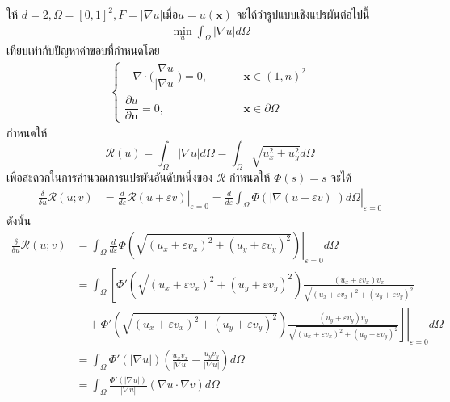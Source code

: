 \begin{Example}
    ให้ $d = 2, \Omega = [0,1]^2, F = |\nabla u| \text{เมื่อ} u = u(\mathbf{x})$ จะได้ว่ารูปแบบเชิงแปรผันต่อไปนี้ 
    \begin{align*}
        \underset{u}{\min} \int_{\Omega} |\nabla u| d \Omega 
    \end{align*}
    เทียบเท่ากับปัญหาค่าขอบที่กำหนดโดย
    \begin{align}
        \left \{ \begin{array}{ll}  - \nabla \cdot  \Big( \dfrac{\nabla u}{|\nabla u|} \Big) = 0,  & \hspace{1cm} \mathbf{x} \in (1,n)^2 \\ \dfrac{\partial u}{\partial \boldsymbol{n}} = 0, & \hspace{1cm} \mathbf{x} \in \partial \Omega \end{array} \right .
    \end{align}
    กำหนดให้ \[
        \mathcal{R}(u) = \int_\Omega |\nabla u| d \Omega = \int_\Omega \sqrt{u_x^2+u_y^2} d \Omega
    \]
    เพื่อสะดวกในการคำนวณการแปรผันอันดับหนึ่งของ  $\mathcal{R}$ กำหนดให้ $\Phi (s)=s$ จะได้
    \begin{align*}
    \frac{\delta}{\delta u}\mathcal{R}(u;v) &= \left.\frac{d}{d\varepsilon}\mathcal{R}(u+\varepsilon v) \right|_{\varepsilon = 0} 
    = \left.\frac{d}{d\varepsilon} \int_{\Omega} \Phi (|\nabla (u + \varepsilon v)|)d\Omega 
    \right|_{\varepsilon = 0} 
    \end{align*}
    ดังนั้น
    \begin{align*}
    \frac{\delta}{\delta u}\mathcal{R}(u;v) 
    &= \int_{\Omega} \left.\frac{d}{d\varepsilon} \Phi ({\sqrt{(u_x+\varepsilon v_x)^2 + (u_y+\varepsilon v_y)^2 }})\right|_{\varepsilon = 0} d\Omega \\
    &= \int_{\Omega}^{}\left[\Phi'({\sqrt{(u_x+\varepsilon v_x)^2 + (u_y+\varepsilon v_y)^2 }}) \frac{(u_x+\varepsilon v_x)v_x}{{\sqrt{(u_x+\varepsilon v_x)^2+ (u_y+\varepsilon v_y)^2 }}}\right.\\
    &\quad + \Phi'({\sqrt{(u_x+\varepsilon v_x)^2 + (u_y+\varepsilon v_y)^2 }}) \left.\left.\frac{(u_y+\varepsilon v_y)v_y}{{\sqrt{(u_x+\varepsilon v_x)^2 + (u_y+\varepsilon v_y)^2 }}}\right] \right|_{\varepsilon = 0} d\Omega 
    \\
    &= \int_{\Omega} \Phi'(|\nabla u|)\left(\frac{u_x v_x}{|\nabla u|} + \frac{u_y v_y}{|\nabla u|} \right) d\Omega \\
    &= \int_{\Omega} \frac{\Phi'(|\nabla u|)}{|\nabla u|} (\nabla u \cdot \nabla v)d\Omega \\

\end{align*}
\end{Example}
